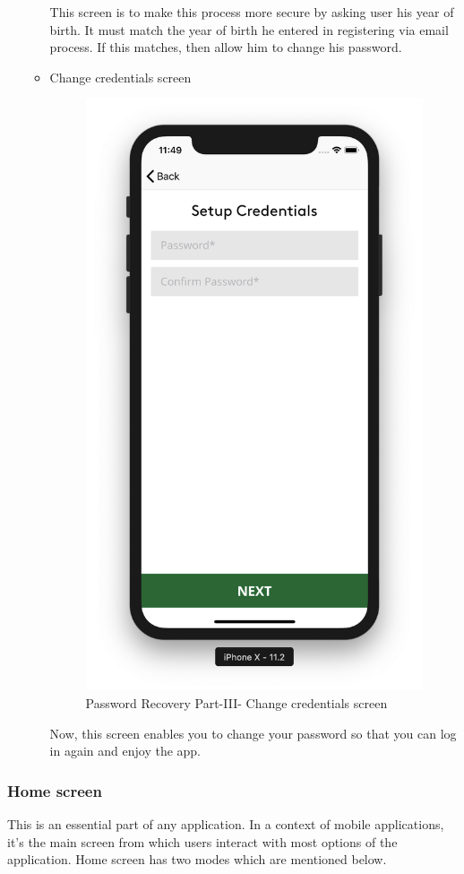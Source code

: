 \begin{itemize}
\begin{itemize}
    This screen is to make this process more secure by asking user his year of birth. It must match the year of birth he entered in registering via email process. If this matches, then allow him to change his password.
 
     \item Change credentials screen
        
        \begin{figure}[H]
            \centering
            \includegraphics[width=0.25\linewidth]{figures/ch4/pass_recovery_3.png}
            \caption{\label{fig:pass_recovery_3} Password Recovery Part-III- Change credentials screen}
        \end{figure}
    
    Now, this screen enables you to change your password so that you can log in again and enjoy the app.
    
    \end{itemize}
    
\end{itemize}

\subsubsection{Home screen}

This is an essential part of any application. In a context of mobile applications, it's the main screen from which users interact with most options of the application. Home screen has two modes which are mentioned below.


